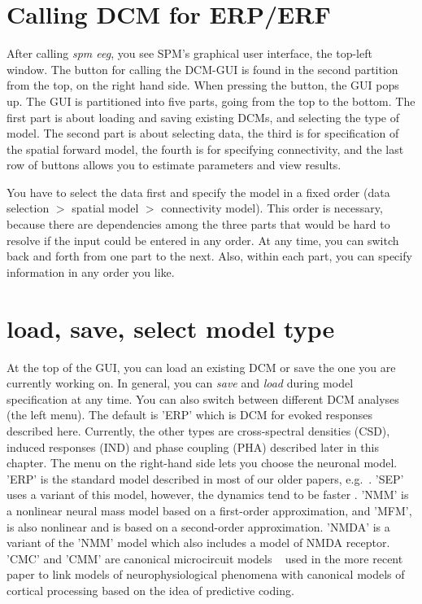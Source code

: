 \section{Calling DCM for ERP/ERF}
After calling \textit{spm eeg}, you see SPM's graphical user interface,
the top-left window. The button for calling the DCM-GUI is found
in the second partition from the top, on the right hand side. When
pressing the button, the GUI pops up. The GUI is partitioned into five
parts, going from the top to the bottom. The first part is about
loading and saving existing DCMs, and selecting the type of model. The second part is about selecting
data, the third is for specification of the spatial forward model, the
fourth is for specifying connectivity, and the last row of
buttons allows you to estimate parameters and view results.

You have to select the data first and specify the model in
a fixed order (data selection $>$ spatial model $>$
connectivity model). This order is necessary, because there are
dependencies among the three parts that would be hard to resolve
if the input could be entered in any order. At any time, you can switch back and forth from one part to
the next. Also, within each part, you can specify information in any
order you like.

\section{load, save, select model type}
At the top of the GUI, you can load an existing DCM or save the one
you are currently working on. In general, you can \textit{save} and
\textit{load} during model specification at any time. You can also
switch between different DCM analyses (the left menu). The default is 'ERP' which is DCM
for evoked responses described here. Currently, the other types are cross-spectral densities (CSD), induced responses (IND) and phase coupling (PHA) described later in this chapter. The menu on the right-hand side lets you choose the neuronal model.   'ERP'  is the standard model described in most of our older papers, e.g.~\cite{od_dcm_erp}.  'SEP' uses a variant of this model, however, the dynamics tend to be faster \cite{andre_sigmoid}. 'NMM' is a nonlinear neural mass model based on a first-order approximation, and  'MFM', is also nonlinear and is based on a second-order approximation. 'NMDA' is a variant of the 'NMM' model which also includes a model of NMDA receptor. 'CMC' and 'CMM'  are canonical microcircuit models ~\cite{Bastos2012} used in the more recent paper to link models of neurophysiological phenomena with canonical models of cortical processing based on the idea of predictive coding. 

